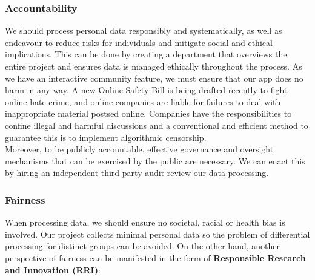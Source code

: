 \subsubsection{Accountability} 
We should process personal data responsibly and systematically, as well as endeavour to reduce risks for individuals and mitigate social and ethical implications.\cite{principles} 
This can be done by creating a department that overviews the entire project and ensures data is managed ethically throughout the process. As we have an interactive community 
feature, we must ensure that our app does no harm in any way. A new Online Safety Bill is being drafted recently to fight online hate crime, and online companies are liable for failures to
deal with inappropriate material postsed online.\cite{francis} \cite{parliamentlaw} Companies have the responsibilities to confine illegal and harmful discussions and a conventional and efficient method
to guarantee this is to implement algorithmic censorship. \\Moreover, to be publicly accountable, effective governance and oversight mechanisms that can be exercised by the public are necessary. 
We can enact this by hiring an independent third-party audit review our data processing.

\subsubsection{Fairness}
When processing data, we should ensure no societal, racial or health bias is involved. Our project collects minimal personal data so the problem of differential processing for distinct groups can be avoided. 
On the other hand, another perspective of fairness can be manifested in the form of \textbf{Responsible Research and Innovation (RRI)}:

